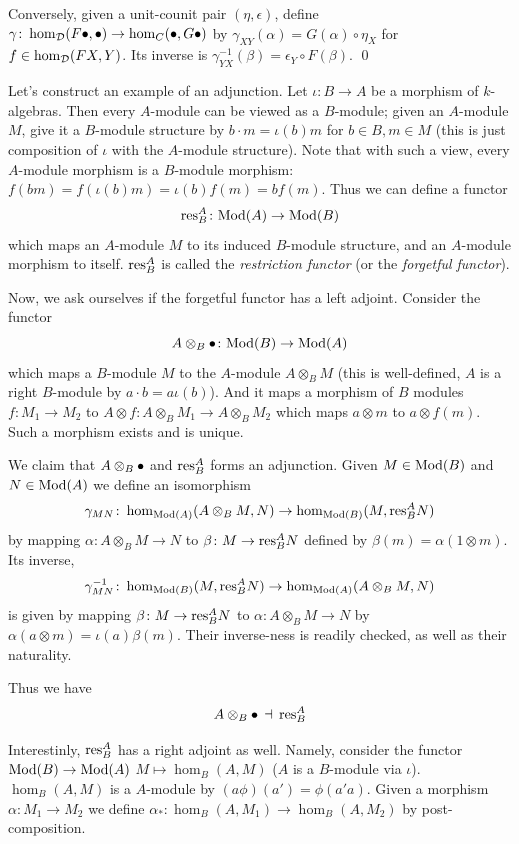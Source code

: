     Conversely, given a unit-counit pair $(\eta,\epsilon)$, define $\gamma\colon\hom_{{\cal D}}(F\bullet,\bullet)\to\hom_C(\bullet,G\bullet)$ by $\gamma_{XY}(\alpha)=G(\alpha)\circ\eta_X$ for $f\in\hom_{{\cal D}}(FX,Y)$.
    Its inverse is $\gamma^{-1}_{YX}(\beta)=\epsilon_Y\circ F(\beta)$.
    \qed

\eproof

Let's construct an example of an adjunction.
Let $\iota\colon B\to A$ be a morphism of $k$-algebras.
Then every $A$-module can be viewed as a $B$-module; given an $A$-module $M$, give it a $B$-module structure by $b\cdot m=\iota(b)m$ for $b\in B,m\in M$ (this is just composition of $\iota$ with the $A$-module
structure).
Note that with such a view, every $A$-module morphism is a $B$-module morphism: $f(bm)=f(\iota(b)m)=\iota(b)f(m)=bf(m)$.
Thus we can define a functor
$$ {\rm res}^A_B\colon{\rm Mod}(A)\to{\rm Mod}(B) $$
which maps an $A$-module $M$ to its induced $B$-module structure, and an $A$-module morphism to itself.
${\rm res}^A_B$ is called the {\it restriction functor} (or the {\it forgetful functor}).

Now, we ask ourselves if the forgetful functor has a left adjoint.
Consider the functor
$$ A\otimes_B\bullet\colon{\rm Mod}(B)\to{\rm Mod}(A) $$
which maps a $B$-module $M$ to the $A$-module $A\otimes_BM$ (this is well-defined, $A$ is a right $B$-module by $a\cdot b=a\iota(b)$).
And it maps a morphism of $B$ modules $f\colon M_1\to M_2$ to $A\otimes f\colon A\otimes_BM_1\to A\otimes_BM_2$ which maps $a\otimes m$ to $a\otimes f(m)$.
Such a morphism exists and is unique.

We claim that $A\otimes_B\bullet$ and ${\rm res}^A_B$ forms an adjunction.
Given $M\in{\rm Mod}(B)$ and $N\in{\rm Mod}(A)$ we define an isomorphism
$$ \gamma_{MN}\colon\hom_{{\rm Mod}(A)}(A\otimes_BM,N) \to \hom_{{\rm Mod}(B)}(M,{\rm res}^A_BN) $$
by mapping $\alpha\colon A\otimes_BM\to N$ to $\beta\colon M\to{\rm res}^A_BN$ defined by $\beta(m)=\alpha(1\otimes m)$.
Its inverse,
$$ \gamma_{MN}^{-1}\colon\hom_{{\rm Mod}(B)}(M,{\rm res}^A_BN) \to \hom_{{\rm Mod}(A)}(A\otimes_BM,N) $$
is given by mapping $\beta\colon M\to{\rm res}^A_BN$ to $\alpha\colon A\otimes_BM\to N$ by $\alpha(a\otimes m)=\iota(a)\beta(m)$.
Their inverse-ness is readily checked, as well as their naturality.

Thus we have
$$ A\otimes_B\bullet\,\dashv\,{\rm res}^A_B $$

Interestinly, ${\rm res}^A_B$ has a right adjoint as well.
Namely, consider the functor ${\rm Mod}(B)\to{\rm Mod}(A)$ $M\mapsto\hom_B(A,M)$ ($A$ is a $B$-module via $\iota$).
$\hom_B(A,M)$ is a $A$-module by $(a\phi)(a')=\phi(a'a)$.
Given a morphism $\alpha\colon M_1\to M_2$ we define $\alpha_*\colon\hom_B(A,M_1)\to\hom_B(A,M_2)$ by post-composition.

